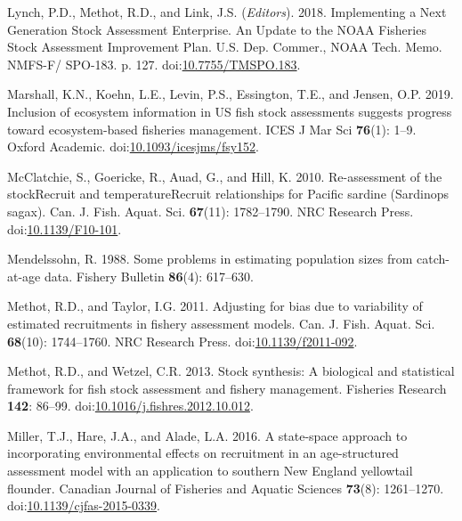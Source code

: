 \documentclass[]{article}
\begin{document}
\leavevmode\hypertarget{ref-lynch2018Implementing}{}%
Lynch, P.D., Methot, R.D., and Link, J.S. (\emph{Editors}). 2018.
Implementing a Next Generation Stock Assessment Enterprise. An Update to
the NOAA Fisheries Stock Assessment Improvement Plan. U.S. Dep. Commer.,
NOAA Tech. Memo. NMFS-F/ SPO-183. p. 127.
doi:\href{https://doi.org/10.7755/TMSPO.183}{10.7755/TMSPO.183}.

\leavevmode\hypertarget{ref-marshall2019Inclusion}{}%
Marshall, K.N., Koehn, L.E., Levin, P.S., Essington, T.E., and Jensen,
O.P. 2019. Inclusion of ecosystem information in US fish stock
assessments suggests progress toward ecosystem-based fisheries
management. ICES J Mar Sci \textbf{76}(1): 1--9. Oxford Academic.
doi:\href{https://doi.org/10.1093/icesjms/fsy152}{10.1093/icesjms/fsy152}.

\leavevmode\hypertarget{ref-mcclatchie2010Reassessment}{}%
McClatchie, S., Goericke, R., Auad, G., and Hill, K. 2010. Re-assessment
of the stockRecruit and temperatureRecruit relationships for Pacific
sardine (Sardinops sagax). Can. J. Fish. Aquat. Sci. \textbf{67}(11):
1782--1790. NRC Research Press.
doi:\href{https://doi.org/10.1139/F10-101}{10.1139/F10-101}.

\leavevmode\hypertarget{ref-mendelssohn1988Problems}{}%
Mendelssohn, R. 1988. Some problems in estimating population sizes from
catch-at-age data. Fishery Bulletin \textbf{86}(4): 617--630.

\leavevmode\hypertarget{ref-methot2011Adjusting}{}%
Methot, R.D., and Taylor, I.G. 2011. Adjusting for bias due to
variability of estimated recruitments in fishery assessment models. Can.
J. Fish. Aquat. Sci. \textbf{68}(10): 1744--1760. NRC Research Press.
doi:\href{https://doi.org/10.1139/f2011-092}{10.1139/f2011-092}.

\leavevmode\hypertarget{ref-methot2013Stock}{}%
Methot, R.D., and Wetzel, C.R. 2013. Stock synthesis: A biological and
statistical framework for fish stock assessment and fishery management.
Fisheries Research \textbf{142}: 86--99.
doi:\href{https://doi.org/10.1016/j.fishres.2012.10.012}{10.1016/j.fishres.2012.10.012}.

\leavevmode\hypertarget{ref-miller2016Statespace}{}%
Miller, T.J., Hare, J.A., and Alade, L.A. 2016. A state-space approach
to incorporating environmental effects on recruitment in an
age-structured assessment model with an application to southern New
England yellowtail flounder. Canadian Journal of Fisheries and Aquatic
Sciences \textbf{73}(8): 1261--1270.
doi:\href{https://doi.org/10.1139/cjfas-2015-0339}{10.1139/cjfas-2015-0339}.
\end{document}
